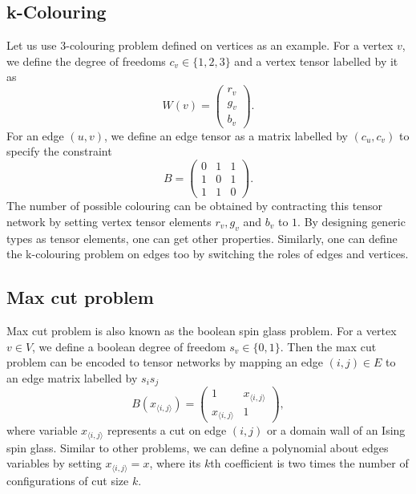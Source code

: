 \documentclass[onefignum, onetabnum]{siamart190516}
\newcommand{\<}{\langle}
\renewcommand{\>}{\rangle}
\newcounter{example}
\begin{document}
\subsection{k-Colouring}
Let us use 3-colouring problem defined on vertices as an example.
For a vertex $v$, we define the degree of freedoms $c_v\in\{1,2,3\}$ and a vertex tensor labelled by it as
\begin{equation}
    W(v) = \left(\begin{matrix}
        r_v\\
        g_v\\
        b_v
    \end{matrix}\right).
\end{equation}
For an edge $(u, v)$, we define an edge tensor as a matrix labelled by $(c_u, c_v)$ to specify the constraint
\begin{equation}
    B = \left(\begin{matrix}
        0 & 1 & 1\\
        1 & 0 & 1\\
        1 & 1 & 0
    \end{matrix}\right).
\end{equation}
The number of possible colouring can be obtained by contracting this tensor network by setting vertex tensor elements $r_v, g_v$ and $b_v$ to $1$.
By designing generic types as tensor elements, one can get other properties.
Similarly, one can define the k-colouring problem on edges too by switching the roles of edges and vertices.

\subsection{Max cut problem}
Max cut problem is also known as the boolean spin glass problem.
For a vertex $v\in V$, we define a boolean degree of freedom $s_v\in\{0, 1\}$.
Then the max cut problem can be encoded to tensor networks by mapping an edge $(i,j)\in E$ to an edge matrix labelled by $s_is_j$
\begin{equation}
    B(x_{\langle i, j\rangle}) = \left(\begin{matrix}
        1 & x_{\langle i, j\rangle}\\
        x_{\langle i, j\rangle} & 1
    \end{matrix}\right),
\end{equation}
where variable $x_{\langle i, j\rangle}$ represents a cut on edge $(i, j)$ or a domain wall of an Ising spin glass.
Similar to other problems, we can define a polynomial about edges variables by setting $x_{\langle i, j\rangle} = x$,
where its $k$th coefficient is two times the number of configurations of cut size $k$.
\end{document}
